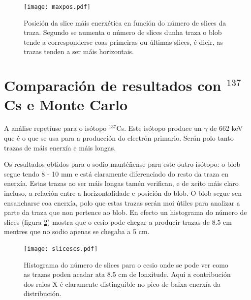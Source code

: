 \documentclass[a4paper,12pt]{article}
\begin{document}
\begin{figure}[!]
\centering
\texttt{[image: maxpos.pdf]}
\caption{Posición da slice máis enerxética en función do número de slices da traza. Segundo se aumenta o número de slices dunha traza o blob tende a corresponderse coas primeiras ou últimas slices, é dicir, as trazas tenden a ser máis horizontais.}
\label{maxpos}
\end{figure}




\section{Comparación de resultados con $^{137}$Cs e Monte Carlo}

A análise repetíuse para o isótopo $^{137}$Cs. Este isótopo produce un $\gamma$ de 662 keV que é o que se usa para a producción do electrón primario. Serán polo tanto trazas de máis enerxía e máis longas.

Os resultados obtidos para o sodio mantéñense para este outro isótopo: o blob segue tendo 8 - 10 mm e está claramente diferenciado do resto da traza en enerxía. Estas trazas ao ser máis longas tamén verifican, e de xeito máis claro incluso, a relación entre a horizontalidade e posición do blob. O blob segue sen ensancharse coa enerxía, polo que estas trazas serán moi útiles para analizar a parte da traza que non pertence ao blob. En efecto un histograma do número de slices (figura  \ref{slicescs}) mostra que o cesio pode chegar a producir trazas de 8.5 cm mentres que no sodio apenas se chegaba a 5 cm.


\begin{figure}[!]
\centering
\texttt{[image: slicescs.pdf]}
\caption{Histograma do número de slices para o cesio onde se pode ver como as trazas poden acadar ata 8.5 cm de lonxitude. Aquí a contribución dos raios X é claramente distinguible no pico de baixa enerxía da distribución.}
\label{slicescs}
\end{figure}
\end{document}
